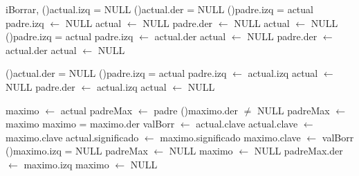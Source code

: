 \begin{Algoritmos}
\begin{algoritmo}{iBorrar}{, }{}
	\eIf(){actual.izq = NULL}{
    	\eIf(){actual.der = NULL}{
    		\eIf(){padre.izq = actual}{
            	padre.izq $\leftarrow$ NULL 
                actual $\leftarrow$ NULL 
            }{
             	padre.der $\leftarrow$ NULL 
                actual $\leftarrow$ NULL          
            }
    	}{
    		\eIf(){padre.izq = actual}{
            	padre.izq $\leftarrow$ actual.der 
                actual $\leftarrow$ NULL 
            }{
             	padre.der $\leftarrow$ actual.der 
                actual $\leftarrow$ NULL         
            }        	
        }
    }{
    	\eIf(){actual.der = NULL}{
    		\eIf(){padre.izq = actual}{
            	padre.izq $\leftarrow$ actual.izq 
                actual $\leftarrow$ NULL 
            }{
             	padre.der $\leftarrow$ actual.izq 
                actual $\leftarrow$ NULL       
            }               
        }{
   			
				maximo $\leftarrow$ actual 
                padreMax $\leftarrow$ padre 
                \While(){maximo.der $\neq$ NULL}{
                	padreMax $\leftarrow$ maximo 
                	maximo = maximo.der 
                }
                valBorr $\leftarrow$ actual.clave 
                actual.clave $\leftarrow$ maximo.clave 
                actual.significado $\leftarrow$ maximo.significado 
                maximo.clave $\leftarrow$ valBorr 
                \eIf(){maximo.izq = NULL}{
                	padreMax $\leftarrow$ NULL 
                    maximo $\leftarrow$ NULL 
                }{
                	padreMax.der $\leftarrow$ maximo.izq 
                    maximo $\leftarrow$ NULL 
                }
                
                     	
        }
    }


\end{algoritmo}
\end{Algoritmos}
